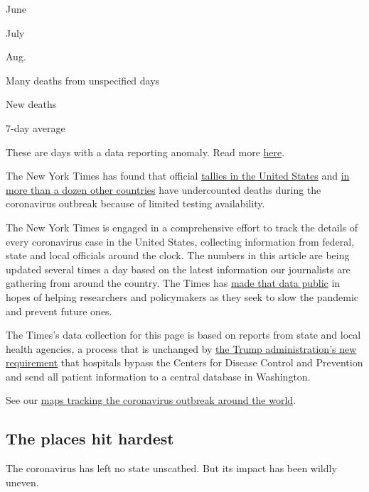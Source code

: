June

July

Aug.

Many deaths from unspecified days

New deaths

7-day average

These are days with a data reporting anomaly. Read more
\protect\hyperlink{anomaly-notes}{here}.

The New York Times has found that official
\href{https://www.nytimes.com/interactive/2020/04/28/us/coronavirus-death-toll-total.html}{tallies
in the United States} and
\href{https://www.nytimes.com/interactive/2020/04/21/world/coronavirus-missing-deaths.html}{in
more than a dozen other countries} have undercounted deaths during the
coronavirus outbreak because of limited testing availability.

The New York Times is engaged in a comprehensive effort to track the
details of every coronavirus case in the United States, collecting
information from federal, state and local officials around the clock.
The numbers in this article are being updated several times a day based
on the latest information our journalists are gathering from around the
country. The Times has
\href{https://www.nytimes.com/article/coronavirus-county-data-us.html?action=click\&module=Spotlight\&pgtype=Homepage}{made
that data public} in hopes of helping researchers and policymakers as
they seek to slow the pandemic and prevent future ones.

The Times's data collection for this page is based on reports from state
and local health agencies, a process that is unchanged by
\href{https://www.nytimes.com/2020/07/14/us/politics/trump-cdc-coronavirus.html}{the
Trump administration's new requirement} that hospitals bypass the
Centers for Disease Control and Prevention and send all patient
information to a central database in Washington.

See our
\href{https://www.nytimes.com/interactive/2020/world/coronavirus-maps.html}{maps
tracking the coronavirus outbreak around the world}.

\hypertarget{the-places-hit-hardest}{%
\subsection{The places hit hardest}\label{the-places-hit-hardest}}

The coronavirus has left no state unscathed. But its impact has been
wildly uneven.

